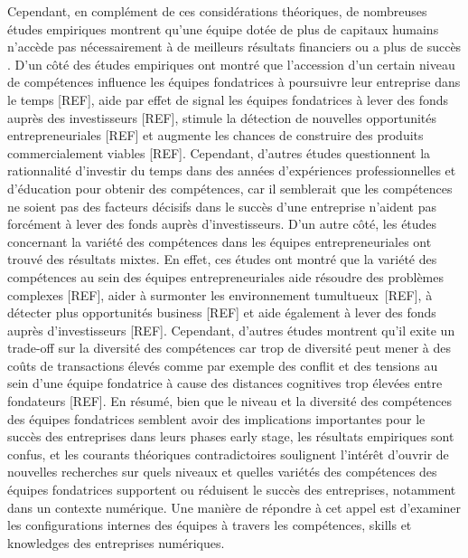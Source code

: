 \documentclass[11pt]{article}
\begin{document}
Cependant, en complément de ces considérations théoriques, de nombreuses études empiriques montrent qu'une équipe dotée de plus de capitaux humains n'accède pas nécessairement à de meilleurs résultats financiers ou a plus de succès \citep{pierce2013too}. D'un côté des études empiriques ont montré que l'accession d'un certain niveau de compétences influence les équipes fondatrices à poursuivre leur entreprise dans le temps [REF], aide par effet de signal les équipes fondatrices à lever des fonds auprès des investisseurs [REF], stimule la détection de nouvelles opportunités entrepreneuriales [REF] et augmente les chances de construire des produits commercialement viables [REF]. Cependant, d'autres études questionnent la rationnalité d'investir du temps dans des années d'expériences professionnelles et d'éducation pour obtenir des compétences, car il semblerait que les compétences ne soient pas des facteurs décisifs dans le succès d'une entreprise n'aident pas forcément à lever des fonds auprès d'investisseurs. D'un autre côté, les études concernant la variété des compétences dans les équipes entrepreneuriales ont trouvé des résultats mixtes. En effet, ces études ont montré que la variété des compétences au sein des équipes entrepreneuriales aide résoudre des problèmes complexes [REF], aider à surmonter les environnement tumultueux [REF], à détecter plus opportunités business [REF] et aide également à lever des fonds auprès d'investisseurs [REF]. Cependant, d'autres études montrent qu'il exite un trade-off sur la diversité des compétences car trop de diversité peut mener à des coûts de transactions élevés comme par exemple des conflit et des tensions au sein d'une équipe fondatrice à cause des distances cognitives trop élevées entre fondateurs [REF]. En résumé, bien que le niveau et la diversité des compétences des équipes fondatrices semblent avoir des implications importantes pour le succès des entreprises dans leurs phases early stage, les résultats empiriques sont confus, et les courants théoriques contradictoires soulignent l'intérêt d'ouvrir de nouvelles recherches sur quels niveaux et quelles variétés des compétences des équipes fondatrices supportent ou réduisent le succès des entreprises, notamment dans un contexte numérique. Une manière de répondre à cet appel est d'examiner les configurations internes des équipes à travers les compétences, skills et knowledges des entreprises numériques.
\end{document}
